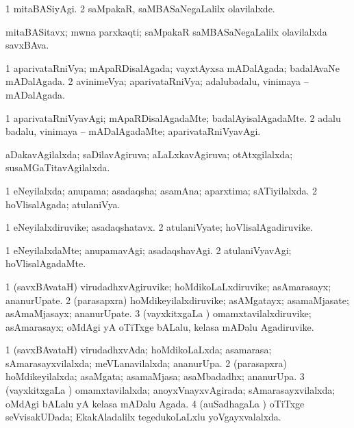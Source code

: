 \bentry
{}
\gl{\kirxvi}
\bmng
\bnum
\num{1} mitaBASiyAgi. 
\num{2} saMpakaR, saMBASaNegaLalilx olavilalxde. 
\enum
\emng
\eentry

\bentry
{}
\gl{\nA}
\bmng
mitaBASitavx; mwna parxkaqti; saMpakaR saMBASaNegaLalilx olavilalxda savxBAva. 
\emng
\eentry

\bentry
{}
\gl{\gu}
\bmng
\bnum
\num{1} aparivataRniVya; mApaRDisalAgada; vayxtAyxsa mADalAgada; badalAvaNe mADalAgada. 
\num{2} avinimeVya; aparivataRniVya; adalubadalu, vinimaya -- mADalAgada. 
\enum
\emng
\eentry

\bentry
{}
\gl{\kirxvi}
\bmng
\bnum
\num{1} aparivataRniVyavAgi; mApaRDisalAgadaMte; badalAyisalAgadaMte. 
\num{2} adalu badalu, vinimaya -- mADalAgadaMte; aparivataRniVyavAgi. 
\enum
\emng
\eentry

\bentry
{}
\gl{\gu}
\bmng
aDakavAgilalxda; saDilavAgiruva; aLaLxkavAgiruva; otAtxgilalxda; susaMGaTitavAgilalxda. 
\emng
\eentry

\bentry
{}
\gl{\gu}
\bmng
\bnum
\num{1} eNeyilalxda; anupama; asadaqsha; asamAna; aparxtima; sATiyilalxda. 
\num{2} hoVlisalAgada; atulaniVya. 
\enum
\emng
\eentry

\bentry
{}
\gl{\nA}
\bmng
\bnum
\num{1} eNeyilalxdiruvike; asadaqshatavx. 
\num{2} atulaniVyate; hoVlisalAgadiruvike. 
\enum
\emng
\eentry

\bentry
{}
\gl{\kirxvi}
\bmng
\bnum
\num{1} eNeyilalxdaMte; anupamavAgi; asadaqshavAgi. 
\num{2} atulaniVyavAgi; hoVlisalAgadaMte. 
\enum
\emng
\eentry

\bentry
{}
\gl{\nA}
\bmng
\bnum
\num{1} (savxBAvataH) virudadhxvAgiruvike; hoMdikoLaLxdiruvike; asAmarasayx; ananurUpate. 
\num{2} (parasapxra) hoMdikeyilalxdiruvike; asAMgatayx; asamaMjasate; asAmaMjasayx; ananurUpate. 
\num{3} (vayxkitxgaLa \vi) omamxtavilalxdiruvike; asAmarasayx; oMdAgi yA oTiTxge bALalu, kelasa mADalu Agadiruvike. 
\enum
\emng
\eentry

\bentry
{}
\gl{\gu}
\bmng
\bnum
\num{1} (savxBAvataH) virudadhxvAda; hoMdikoLaLxda; asamarasa; sAmarasayxvilalxda; meVLanavilalxda; ananurUpa. 
\num{2} (parasapxra) hoMdikeyilalxda; asaMgata; asamaMjasa; asaMbadadhx; ananurUpa. 
\num{3} (vayxkitxgaLa \vi) omamxtavilalxda; anoyxVnayxvAgirada; sAmarasayxvilalxda; oMdAgi bALalu yA kelasa mADalu Agada. 
\num{4} (auSadhagaLa \vi) oTiTxge seVvisakUDada; EkakAladalilx tegedukoLaLxlu yoVgayxvalalxda. 
\enum
\emng
\eentry

